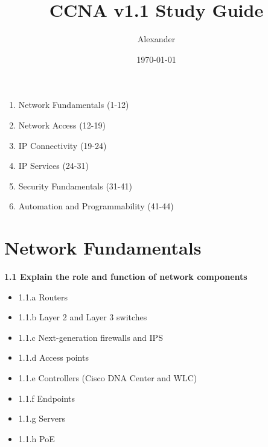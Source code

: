 \documentclass{article}
\title{CCNA v1.1 Study Guide}
\author{Alexander}
\date{\today}
\begin{document}
\maketitle

\begin{enumerate}
\item Network Fundamentals (1-12)
\item Network Access (12-19)
\item IP Connectivity (19-24)
\item IP Services (24-31)
\item Security Fundamentals (31-41)
\item Automation and Programmability (41-44)
\end{enumerate}

\section{Network Fundamentals}
\textbf{1.1 Explain the role and function of network components}
\begin{itemize}
\item 1.1.a Routers
\item 1.1.b Layer 2 and Layer 3 switches
\item 1.1.c Next-generation firewalls and IPS
\item 1.1.d Access points
\item 1.1.e Controllers (Cisco DNA Center and WLC)
\item 1.1.f Endpoints
\item 1.1.g Servers
\item 1.1.h PoE
\end{itemize}
  
\end{document}
